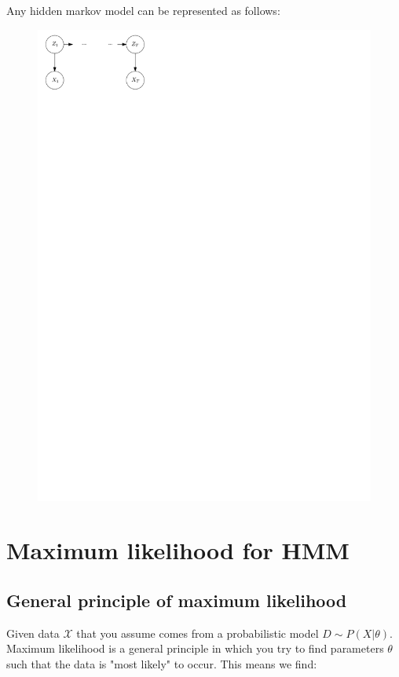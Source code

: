 Any hidden markov model can be represented as follows:
\begin{figure}[h!]
	\centering
	\includegraphics{fig/HMM.pdf}
\end{figure}
\section{Maximum likelihood for HMM}
\subsection{General principle of maximum likelihood}
	
Given data $\mathcal{X}$ that you assume comes from a probabilistic model $D \sim P(X|\theta)$. Maximum likelihood is a general principle in which you try to find parameters $\theta$ such that the data is "most likely" to occur. This means we find:

